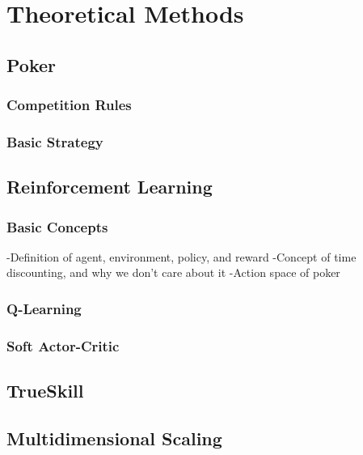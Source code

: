 \chapter{Theoretical Methods}


\section{Poker}

\subsection{Competition Rules}

\subsection{Basic Strategy}

\section{Reinforcement Learning}
\subsection{Basic Concepts}
-Definition of agent, environment, policy, and reward
-Concept of time discounting, and why we don't care about it
-Action space of poker

\subsection{Q-Learning}

\subsection{Soft Actor-Critic}


\section{TrueSkill}


\section{Multidimensional Scaling}